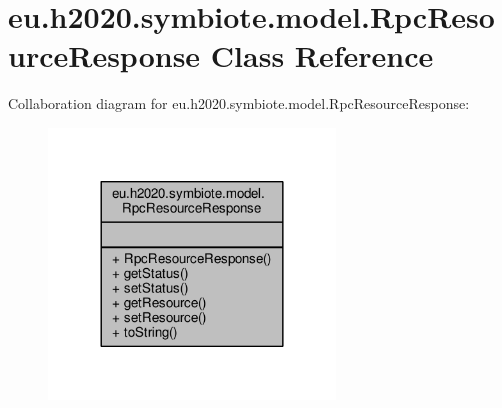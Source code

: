 \hypertarget{classeu_1_1h2020_1_1symbiote_1_1model_1_1RpcResourceResponse}{}\section{eu.\+h2020.\+symbiote.\+model.\+Rpc\+Resource\+Response Class Reference}
\label{classeu_1_1h2020_1_1symbiote_1_1model_1_1RpcResourceResponse}


Collaboration diagram for eu.\+h2020.\+symbiote.\+model.\+Rpc\+Resource\+Response\+:
\nopagebreak
\begin{figure}[H]
\begin{center}
\leavevmode
\includegraphics[width=216pt]{classeu_1_1h2020_1_1symbiote_1_1model_1_1RpcResourceResponse__coll__graph}
\end{center}
\end{figure}
